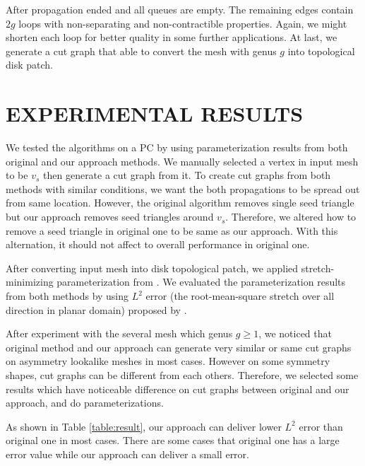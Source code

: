 \documentclass[a4paper,twoside]{article}
\begin{document}
After propagation ended and all queues are empty. The remaining edges contain $2g$ loops with non-separating and non-contractible properties. Again, we might shorten each loop for better quality in some further applications. At last, we generate a cut graph that able to convert the mesh with genus $g$ into topological disk patch.


\section{\uppercase{Experimental Results}}
\label{sec:Experiment Results}
\noindent We tested the algorithms on a PC by using parameterization results from both original and our approach methods. We manually selected a vertex in input mesh to be $v_s$ then generate a cut graph from it. To create cut graphs from both methods with similar conditions, we want the both propagations to be spread out from same location. However, the original algorithm removes single seed triangle but our approach removes seed triangles around $v_s$. Therefore, we altered how to remove a seed triangle in original one to be same as our approach. With this alternation, it should not affect to overall performance in original one.

After converting input mesh into disk topological patch, we applied stretch-minimizing parameterization from \cite{Yoshizawa_SMI04}.  We evaluated the parameterization results from both methods by using $L^2$ error (the root-mean-square stretch over all direction in planar domain) proposed by \cite{Sander:2001:TMP:383259.383307,Sander:2002:SP:581896.581909}.  

After experiment with the several mesh which genus $g \geq 1$, we noticed that original method and our approach can generate very similar or same cut graphs on asymmetry lookalike meshes in most cases. However on some symmetry shapes, cut graphs can be different from each others. Therefore, we selected some results which have noticeable difference on cut graphs between original and our approach, and do parameterizations.

As shown in Table \ref{table:result}, our approach can deliver lower  $L^2$ error than original one in most cases. There are some cases that original one has a large error value while our approach can deliver a small error.
\end{document}
